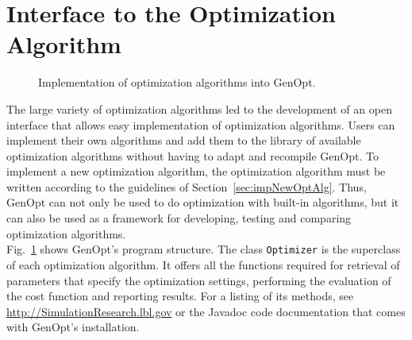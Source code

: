 \section{Interface to the Optimization Algorithm}
\begin{figure}
\centering
\scalebox{0.8}{  }
\caption{Implementation of optimization algorithms into GenOpt.}
\label{fig:algImp}
\end{figure}
The large variety of optimization algorithms led to the development of
an open interface that allows easy implementation of optimization algorithms.
Users can implement their own algorithms and add them to the library of available optimization algorithms without having to adapt and recompile GenOpt.
To implement a new optimization algorithm,
the optimization algorithm must be written according to the guidelines 
of Section~\ref{sec:impNewOptAlg}.
Thus, GenOpt can not only be used to do optimization with built-in algorithms, 
but it can also be used as a framework for developing, testing and comparing 
optimization algorithms.\\

Fig.~\ref{fig:algImp} shows GenOpt's program structure.
The class \texttt{Optimizer} is the superclass of each optimization algorithm. 
It offers all the functions required for retrieval of parameters that specify 
the optimization settings, performing the evaluation of the cost function and reporting results. 
For a listing of its methods, 
see \url{http://SimulationResearch.lbl.gov} or the Javadoc code documentation 
that comes with GenOpt's installation.


